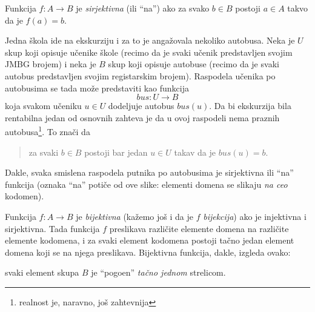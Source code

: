 \bigskip

Funkcija $f : A \to B$ je \emph{sirjektivna} (ili ``na'') ako za svako $b \in B$ postoji
$a \in A$ takvo da je $f(a) = b$.

\begin{EX}
  Jedna \v skola ide na ekskurziju i za to je anga\v zovala nekoliko autobusa.
  Neka je $U$ skup koji opisuje u\v cenike \v skole (recimo da je svaki u\v cenik predstavljen svojim JMBG brojem)
  i neka je $B$ skup koji opisuje autobuse (recimo da je svaki autobus predstavljen svojim registarskim brojem).
  Raspodela u\v cenika po autobusima se tada mo\v ze predstaviti kao funkcija
  $$
    \mathit{bus} : U \to B
  $$
  koja svakom u\v ceniku $u \in U$ dodeljuje autobus $\mathit{bus}(u)$. Da bi ekskurzija bila rentabilna
  jedan od osnovnih zahteva je da u ovoj raspodeli nema praznih autobusa\footnote{realnost je, naravno, jo\v s zahtevnija}.
  To zna\v ci da
  \begin{quote}
    za svaki $b \in B$ postoji bar jedan $u \in U$ takav da je $\mathit{bus}(u) = b$.
  \end{quote}
  \begin{center}
    
  \end{center}
  Dakle, svaka smislena raspodela putnika po autobusima je sirjektivna ili ``na'' funkcija (oznaka ``na''
  poti\v ce od ove slike: elementi domena se slikaju \emph{na ceo} kodomen).
\end{EX}

\bigskip

Funkcija $f : A \to B$ je \emph{bijektivna} (ka\v zemo jo\v s i da je $f$ \emph{bijekcija}) ako je injektivna i sirjektivna.
Tada funkcija $f$ preslikava razli\v cite elemente domena na razli\v cite elemente kodomena, i za svaki element kodomena
postoji ta\v cno jedan element domena koji se na njega preslikava. Bijektivna funkcija, dakle, izgleda ovako:
  \begin{center}
    
  \end{center}
svaki element skupa $B$ je ``pogo\dj en'' \emph{ta\v cno jednom} strelicom.

